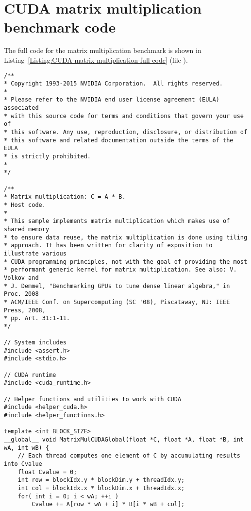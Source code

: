 \newpage 									%
\appendix 								 	%

\chapter{CUDA matrix multiplication benchmark code}\label{Attachment:CUDA-matrix-multiplication-code}
The full code for the matrix multiplication benchmark is shown in Listing~\ref{Listing:CUDA-matrix-multiplication-full-code} (file ).
\begin{lstlisting}[caption={Matrix multiplication benchmark code. Taken from Nvidia's samples located in the users home directory by default: \code{\$HOME/NVIDIA-samples/0\_Introduction/matrixMul/}.},label={Listing:CUDA-matrix-multiplication-full-code},escapechar=@]
/**
* Copyright 1993-2015 NVIDIA Corporation.  All rights reserved.
*
* Please refer to the NVIDIA end user license agreement (EULA) associated
* with this source code for terms and conditions that govern your use of
* this software. Any use, reproduction, disclosure, or distribution of
* this software and related documentation outside the terms of the EULA
* is strictly prohibited.
*
*/

/**
* Matrix multiplication: C = A * B.
* Host code.
*
* This sample implements matrix multiplication which makes use of shared memory
* to ensure data reuse, the matrix multiplication is done using tiling
* approach. It has been written for clarity of exposition to illustrate various
* CUDA programming principles, not with the goal of providing the most
* performant generic kernel for matrix multiplication. See also: V. Volkov and
* J. Demmel, "Benchmarking GPUs to tune dense linear algebra," in Proc. 2008
* ACM/IEEE Conf. on Supercomputing (SC '08), Piscataway, NJ: IEEE Press, 2008,
* pp. Art. 31:1-11.
*/

// System includes
#include <assert.h>
#include <stdio.h>

// CUDA runtime
#include <cuda_runtime.h>

// Helper functions and utilities to work with CUDA
#include <helper_cuda.h>
#include <helper_functions.h>

template <int BLOCK_SIZE>
__global__ void MatrixMulCUDAGlobal(float *C, float *A, float *B, int wA, int wB) {
	// Each thread computes one element of C by accumulating results into Cvalue
	float Cvalue = 0;
	int row = blockIdx.y * blockDim.y + threadIdx.y;
	int col = blockIdx.x * blockDim.x + threadIdx.x;
	for( int i = 0; i < wA; ++i )
		Cvalue += A[row * wA + i] * B[i * wB + col];
	

\end{lstlisting}
